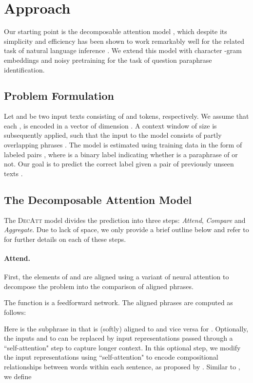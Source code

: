 \documentclass[11pt,letterpaper]{article}
\begin{document}
\section{Approach}
Our starting point is the decomposable attention model \cite[\textsc{DecAtt} henceforth]{parikh.etal.2016}, which despite its simplicity and efficiency has been shown to work remarkably well for the related task of natural language inference \cite{bowman2015large}.
We extend this model with character -gram embeddings and noisy pretraining for the task of question paraphrase identification.

\subsection{Problem Formulation}\label{subsec:prob_formulation}
Let  and  be two input texts consisting of  and  tokens, respectively.
We assume that each ,  is encoded in a vector of dimension .
A context window of size  is subsequently applied, such that the input to the model  consists of partly overlapping phrases .
The model is estimated using training data in the form of labeled pairs , where  is a binary label indicating whether  is a paraphrase of  or not.
Our goal is to predict the correct label  given a pair of previously unseen texts .

\subsection{The Decomposable Attention Model}
The \textsc{DecAtt} model divides the prediction into three steps: \emph{Attend}, \emph{Compare} and \emph{Aggregate}. Due to lack of space, we only provide a brief outline below and refer to  for further details on each of these steps. 

\paragraph{Attend.}
First, the elements of  and  are aligned using a variant of neural attention \cite{bahdanau2014neural} to decompose the problem into the comparison of aligned phrases.

The function  is a feedforward network.  The aligned phrases are computed as follows:

Here  is the subphrase in  that is (softly) aligned to  and vice versa for .
Optionally, the inputs  and  to  can be replaced by input representations passed through a ``self-attention" step to capture longer context.
In this optional step, we modify the input representations using ``self-attention" to encode compositional relationships between words within each sentence, as proposed by \cite{cheng-dong-lapata:2016:EMNLP2016}.
Similar to , we define
\end{document}
